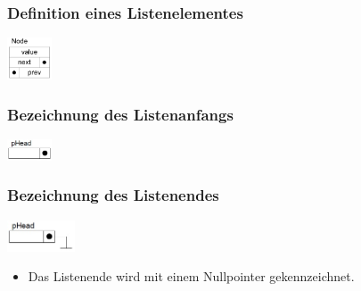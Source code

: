 \subsubsection{Definition eines Listenelementes}
\begin{flushleft}
  {\includegraphics[width=0.1\textwidth]{images/Listen/DLL.png}}
  \label{Fig: Double Linked List}
\end{flushleft}


\begin{multicols}{2}
\subsubsection{Bezeichnung des Listenanfangs}
\begin{flushleft}
  {\includegraphics[width=0.1\textwidth]{images/Listen/SLL_Anfang.jpg}}
  \label{Fig: Single Linked List}
\end{flushleft}


\subsubsection{Bezeichnung des Listenendes}
\begin{flushleft}
  {\includegraphics[width=0.15\textwidth]{images/Listen/SLL_Ende.jpg}}
  \label{Fig: Single Linked List}
\end{flushleft}
\begin{itemize}
  \item Das Listenende wird mit einem Nullpointer gekennzeichnet.
\end{itemize}
\end{multicols}

